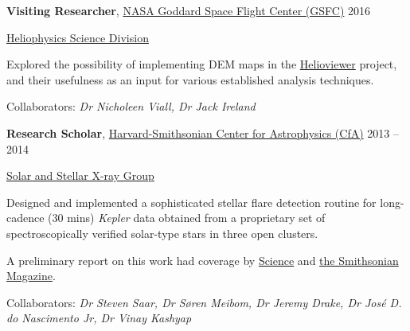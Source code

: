 \documentclass[11pt]{article}
\newcommand{\makeheading}[2][]%
        {\hspace*{-\marginparsep minus \marginparwidth}%
         \begin{minipage}[t]{\textwidth+\marginparwidth+\marginparsep}%
             {\large \bfseries #2 \hfill #1}\\[-0.15\baselineskip]%
                 \rule{\columnwidth}{1pt}%
         \end{minipage}}
\newcommand{\halfblankline}{\quad\vspace{-0.5\baselineskip}\pagebreak[3]}
\begin{document}
%
\halfblankline

\textbf{Visiting Researcher},
	\href{https://www.nasa.gov/goddard}{NASA Goddard Space Flight Center (GSFC)} \hfill {2016}
\begin{innerlist}

    \item[] \href{https://science.gsfc.nasa.gov/heliophysics/}{Heliophysics Science Division}
    \begin{innerlist}
    	\item{} Explored the possibility of implementing DEM maps in the \href{www.helioviewer.org}{Helioviewer} project, and their usefulness as an input for various established analysis techniques.
    \end{innerlist}
        	\item[] Collaborators: {\it Dr Nicholeen Viall, Dr Jack Ireland}

\end{innerlist}

\halfblankline

 \textbf{Research Scholar},
	\href{https://www.cfa.harvard.edu/}{Harvard-Smithsonian Center for Astrophysics (CfA)} \hfill {2013 -- 2014}
\begin{innerlist}

    \item[] \href{https://www.cfa.harvard.edu/research/hea/sun}{Solar and Stellar X-ray Group}
    \begin{innerlist}
    	\item{} Designed and implemented a sophisticated stellar flare detection routine for long-cadence (30 mins) {\it Kepler} data obtained from a proprietary set of spectroscopically verified solar-type stars in three open clusters.\item{} A preliminary report on this work had coverage by \href{http://www.sciencemag.org/news/2015/08/when-sun-s-next-superflare-due?rss=1}{Science} and \href{http://www.smithsonianmag.com/smart-news/when-next-solar-superflare-hit-earth-180956288/}{the Smithsonian Magazine}.%
    \end{innerlist}    	
    	\item[] Collaborators: {\it Dr Steven Saar, Dr S{\o}ren Meibom, Dr Jeremy Drake, Dr Jos{\'e} D. do Nascimento Jr, Dr Vinay Kashyap}
\end{innerlist}
\halfblankline
\end{document}
